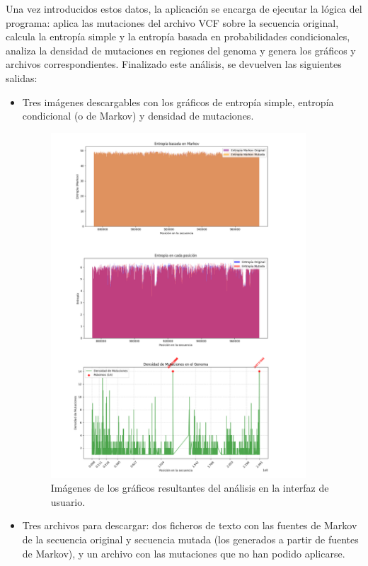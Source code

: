 \documentclass[11pt,spanish,listoffigures,listoftables]{tfgetsinf}
\begin{document}
Una vez introducidos estos datos, la aplicación se encarga de ejecutar la lógica del programa: aplica las mutaciones del archivo \acs{VCF} sobre la secuencia original, calcula la entropía simple y la entropía basada en probabilidades condicionales, analiza la densidad de mutaciones en regiones del genoma y genera los gráficos y archivos correspondientes. Finalizado este análisis, se devuelven las siguientes salidas:  

\begin{itemize}
   \item Tres imágenes descargables con los gráficos de entropía simple, entropía condicional (o de Markov) y densidad de mutaciones. 
   \begin{figure}[H]
      \centering
      \includegraphics[width=0.9\textwidth]{Graficos_RP.png}
      \caption{Imágenes de los gráficos resultantes del análisis en la interfaz de usuario.}
      \label{fig:etiqueta_opcional9}
   \end{figure}
   \item Tres archivos para descargar: dos ficheros de texto con las fuentes de Markov de la secuencia original y secuencia mutada (los generados a partir de fuentes de Markov), y un archivo con las mutaciones que no han podido aplicarse. 

\end{itemize}
\end{document}
